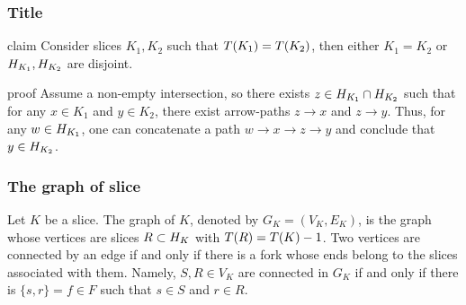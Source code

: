 \documentclass{beamer}
\begin{document}
\begin{frame}
  \frametitle{Title} 

  \begin{block}{claim}
    \label{cref:disj}
    Consider slices $K_{1}, K_{2}$ such that $T(K_1) = T(K_2)$, then either $K_{1}=K_{2}$ or $H_{K_1}, H_{K_2}$ are disjoint.
  \end{block}
  \begin{block}{proof}
Assume a non-empty intersection, so there exists $z \in H_{K_{1}}\cap H_{K_{2}}$ such that for any $x \in K_{1}$ and $y \in K_{2}$, there exist arrow-paths $z \rightarrow x$ and $z \rightarrow y$. Thus, for any $w \in H_{K_{1}}$, one can concatenate a path $w \rightarrow x \rightarrow z \rightarrow y$ and conclude that $y \in H_{K_{2}}$.
  \end{block}

\end{frame}

\begin{frame}
  \frametitle{The graph of slice} 
    Let $K$ be a slice. The graph of $K$, denoted by $G_{K} = (V_{K}, E_{K})$, is the graph whose vertices are slices $R \subset H_{K}$ with $T(R) = T(K) - 1$. Two vertices are connected by an edge if and only if there is a fork whose ends belong to the slices associated with them. Namely, $S, R \in V_{K}$ are connected in $G_{K}$ if and only if there is $\{s, r\} = f \in F$ such that $s \in S$ and $r \in R$.
\end{frame}
\end{document}
